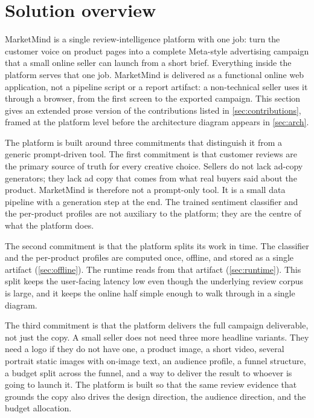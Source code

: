 \documentclass[12pt,a4paper]{report}
\begin{document}
\section{Solution overview}
\label{sec:solution}

MarketMind is a single review-intelligence platform with one job: turn the customer voice on product pages into a complete Meta-style advertising campaign that a small online seller can launch from a short brief. Everything inside the platform serves that one job. MarketMind is delivered as a functional online web application, not a pipeline script or a report artifact: a non-technical seller uses it through a browser, from the first screen to the exported campaign. This section gives an extended prose version of the contributions listed in \cref{sec:contributions}, framed at the platform level before the architecture diagram appears in \cref{sec:arch}.

The platform is built around three commitments that distinguish it from a generic prompt-driven tool. The first commitment is that customer reviews are the primary source of truth for every creative choice. Sellers do not lack ad-copy generators; they lack ad copy that comes from what real buyers said about the product. MarketMind is therefore not a prompt-only tool. It is a small data pipeline with a generation step at the end. The trained sentiment classifier and the per-product profiles are not auxiliary to the platform; they are the centre of what the platform does.

The second commitment is that the platform splits its work in time. The classifier and the per-product profiles are computed once, offline, and stored as a single artifact (\cref{sec:offline}). The runtime reads from that artifact (\cref{sec:runtime}). This split keeps the user-facing latency low even though the underlying review corpus is large, and it keeps the online half simple enough to walk through in a single diagram.

The third commitment is that the platform delivers the full campaign deliverable, not just the copy. A small seller does not need three more headline variants. They need a logo if they do not have one, a product image, a short video, several portrait static images with on-image text, an audience profile, a funnel structure, a budget split across the funnel, and a way to deliver the result to whoever is going to launch it. The platform is built so that the same review evidence that grounds the copy also drives the design direction, the audience direction, and the budget allocation.
\end{document}

